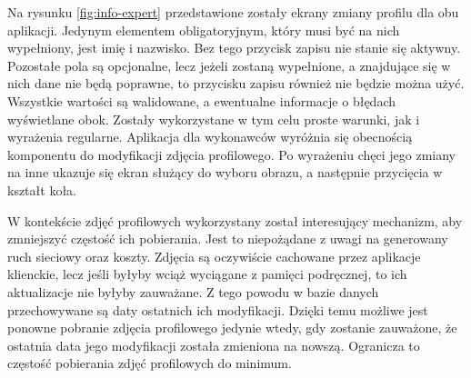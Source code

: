 Na rysunku \ref{fig:info-expert} przedstawione zostały ekrany zmiany profilu dla obu aplikacji. Jedynym elementem obligatoryjnym, który musi być na nich wypełniony, jest imię i nazwisko. Bez tego przycisk zapisu nie stanie się aktywny. Pozostałe pola są opcjonalne, lecz jeżeli zostaną wypełnione, a znajdujące się w nich dane nie będą poprawne, to przycisku zapisu również nie będzie można użyć. Wszystkie wartości są walidowane, a ewentualne informacje o błędach wyświetlane obok. Zostały wykorzystane w tym celu proste warunki, jak i wyrażenia regularne. Aplikacja dla wykonawców wyróżnia się obecnością komponentu do modyfikacji zdjęcia profilowego. Po wyrażeniu chęci jego zmiany na inne ukazuje się ekran służący do wyboru obrazu, a następnie przycięcia w kształt koła.

W kontekście zdjęć profilowych wykorzystany został interesujący mechanizm, aby zmniejszyć częstość ich pobierania. Jest to niepożądane z uwagi na generowany ruch sieciowy oraz koszty. Zdjęcia są oczywiście cachowane przez aplikacje klienckie, lecz jeśli byłyby wciąż wyciągane z pamięci podręcznej, to ich aktualizacje nie byłyby zauważane. Z tego powodu w bazie danych przechowywane są daty ostatnich ich modyfikacji. Dzięki temu możliwe jest ponowne pobranie zdjęcia profilowego jedynie wtedy, gdy zostanie zauważone, że ostatnia data jego modyfikacji została zmieniona na nowszą. Ogranicza to częstość pobierania zdjęć profilowych do minimum.

